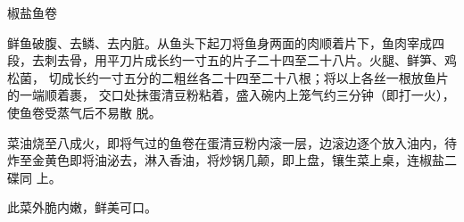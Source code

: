 \begin{recipe}{椒盐鱼卷}

\ingredients


\preparation

\step 鲜鱼破腹、去鳞、去内脏。从鱼头下起刀将鱼身两面的肉顺着片下，鱼肉宰成四
段，去刺去骨，用平刀片成长约一寸五的片子二十四至二十八片。火腿、鲜笋、鸡松菌，
切成长约一寸五分的二粗丝各二十四至二十八根；将以上各丝一根放鱼片的一端顺着裹，
交口处抹蛋清豆粉粘着，盛入碗内上笼气约三分钟（即打一火），使鱼卷受蒸气后不易散
脱。

\step 菜油烧至八成火，即将气过的鱼卷在蛋清豆粉内滚一层，边滚边逐个放入油内，待
炸至金黄色即将油泌去，淋入香油，将炒锅几颠，即上盘，镶生菜上桌，连椒盐二碟同
上。

\features

此菜外脆内嫩，鲜美可口。

\end{recipe}

